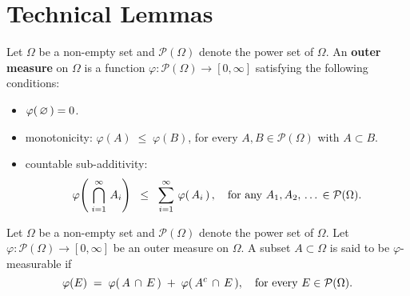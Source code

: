 

\section{Technical Lemmas}
\setcounter{theorem}{0}
\setcounter{equation}{0}

\renewcommand{\theenumi}{\roman{enumi}}
\renewcommand{\labelenumi}{\textnormal{(\theenumi)}$\;\;$}

\begin{definition}\label{definition:OuterMeasure}
\mbox{}
\vskip 0.1cm
\noindent
Let $\Omega$ be a non-empty set and $\mathcal{P}(\Omega)$ denote the power set of $\Omega$.
An \textbf{outer measure} on $\Omega$ is a function
$\varphi : \mathcal{P}(\Omega) \longrightarrow [0,\infty]$
satisfying the following conditions:
\begin{itemize}
\item	$\varphi(\,\varnothing\,) = 0$.
\item	monotonicity: $\varphi(A) \;\leq\; \varphi(B)$, for every $A, B \in \mathcal{P}(\Omega)$ with $A \subset B$.
\item	countable sub-additivity:
		\begin{equation*}
		\varphi\!\left(\;\bigcap_{i=1}^{\infty}\,A_{i}\right)
		\;\; \leq \;\; \sum_{i=1}^{\infty}\,\varphi\!\left(\,A_{i}\,\right),
		\quad
		\textnormal{for any $A_{1}, A_{2}, \,\ldots\, \in \mathcal{P}(\Omega)$}.
		\end{equation*}
\end{itemize}
\end{definition}

\begin{definition}\label{definition:Measurability}
\mbox{}
\vskip 0.1cm
\noindent
Let $\Omega$ be a non-empty set and $\mathcal{P}(\Omega)$ denote the power set of $\Omega$.
Let $\varphi : \mathcal{P}(\Omega) \longrightarrow [0,\infty]$ be an outer measure on $\Omega$.
A subset $A \subset \Omega$ is said to be $\varphi$-measurable if
\begin{equation*}
\varphi(E) \;=\; \varphi(\,A \,\cap\, E\,) \;+\; \varphi(\,A^{c}\,\cap\, E\,),
\quad
\textnormal{for every $E \in \mathcal{P}(\Omega)$}.
\end{equation*}
\end{definition}

